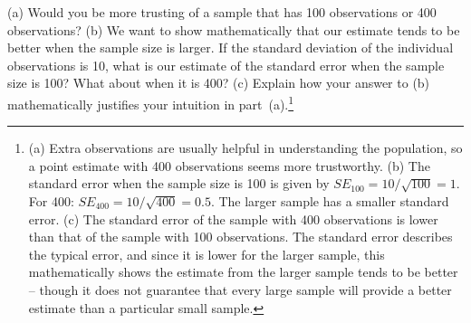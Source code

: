 \begin{exercise}
(a) Would you be more trusting of a sample that has 100 observations or 400 observations? (b) We want to show mathematically that our estimate tends to be better when the sample size is larger. If the standard deviation of the individual observations is 10, what is our estimate of the standard error when the sample size is 100? What about when it is 400? (c) Explain how your answer to (b) mathematically justifies your intuition in part~(a).\footnote{(a) Extra observations are usually helpful in understanding the population, so a point estimate with 400 observations seems more trustworthy. (b) The standard error when the sample size is 100 is given by $SE_{100} = 10/\sqrt{100} = 1$. For 400: $SE_{400} = 10/\sqrt{400} = 0.5$. The larger sample has a smaller standard error. (c) The standard error of the sample with 400 observations is lower than that of the sample with 100 observations. The standard error describes the typical error, and since it is lower for the larger sample, this mathematically shows the estimate from the larger sample tends to be better -- though it does not guarantee that every large sample will provide a better estimate than a particular small sample.}
\end{exercise}

%







